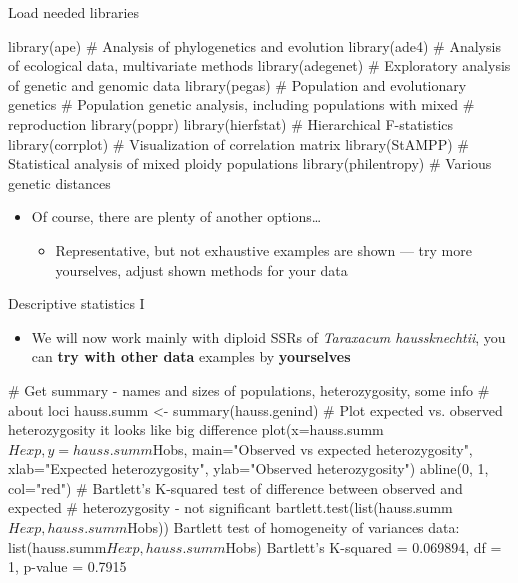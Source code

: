 \documentclass[compress, xelatex, 11pt, xcolor=svgnames, aspectratio=169, url={hyphens, lowtilde}]{beamer}
\begin{document}
\begin{frame}[fragile]{Load needed libraries}
	\begin{spluscode}
    library(ape) # Analysis of phylogenetics and evolution
    library(ade4) # Analysis of ecological data, multivariate methods
    library(adegenet) # Exploratory analysis of genetic and genomic data
    library(pegas) # Population and evolutionary genetics
    # Population genetic analysis, including populations with mixed
    # reproduction
    library(poppr)
    library(hierfstat) # Hierarchical F-statistics
    library(corrplot) # Visualization of correlation matrix
    library(StAMPP) # Statistical analysis of mixed ploidy populations
    library(philentropy) # Various genetic distances
	\end{spluscode}
	\begin{itemize}
		\item Of course, there are plenty of another options\ldots
		\begin{itemize}
			\item Representative, but not exhaustive examples are shown --- \alert{try more yourselves, adjust shown methods for your data}
		\end{itemize}
	\end{itemize}
\end{frame}

\begin{frame}[fragile]{Descriptive statistics I}
	\label{popgenindx}
	\begin{itemize}
		\item We will now work mainly with diploid SSRs of \textit{Taraxacum haussknechtii}, you can \textbf{try with other data} examples by \textbf{yourselves}
	\end{itemize}
	\begin{spluscode}
    # Get summary - names and sizes of populations, heterozygosity, some info
    # about loci
    hauss.summ <- summary(hauss.genind)
    # Plot expected vs. observed heterozygosity it looks like big difference
    plot(x=hauss.summ$Hexp, y=hauss.summ$Hobs,
      main="Observed vs expected heterozygosity",
      xlab="Expected heterozygosity", ylab="Observed heterozygosity")
    abline(0, 1, col="red")
    # Bartlett's K-squared test of difference between observed and expected
    # heterozygosity - not significant
    bartlett.test(list(hauss.summ$Hexp, hauss.summ$Hobs))
                  Bartlett test of homogeneity of variances
    data:  list(hauss.summ$Hexp, hauss.summ$Hobs)
    Bartlett's K-squared = 0.069894, df = 1, p-value = 0.7915
	\end{spluscode}
\end{frame}
\end{document}
